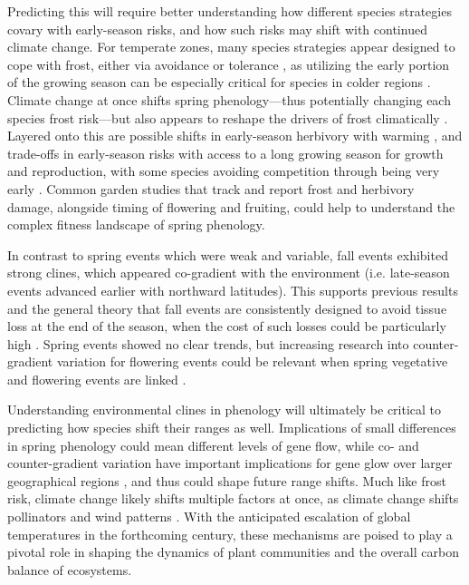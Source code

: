 \documentclass{article}
\begin{document}
Predicting this will require better understanding how different species strategies covary with early-season risks, and how such risks may shift with continued climate change. For temperate zones, many species strategies appear designed to cope with frost, either via avoidance or tolerance \citep{alberto11, lenz16, allevato19}, as utilizing the early portion of the growing season can be especially critical for species in colder regions \citep{morin07, dantec15}. Climate change at once shifts spring phenology---thus potentially changing each species frost risk---but also appears to reshape the drivers of frost climatically \citep{cat2021pep}. Layered onto this are possible shifts in early-season herbivory with warming \citep{meineke2019}, and trade-offs in early-season risks with access to a long growing season for growth and reproduction, with some species avoiding competition through being very early \citep{guo22}. Common garden studies that track and report frost and herbivory damage, alongside timing of flowering and fruiting, could help to understand the complex fitness landscape of spring phenology. 

In contrast to spring events which were weak and variable, fall events exhibited strong clines, which appeared co-gradient with the environment (i.e. late-season events advanced earlier with northward latitudes). This supports previous results and the general theory that fall events are consistently designed to avoid tissue loss at the end of the season, when the cost of such losses could be particularly high \citep{AitkenBemmels16, Alberto13}. Spring events showed no clear trends, but increasing research into counter-gradient variation for flowering events could be relevant when spring vegetative and flowering events are linked \citep{dan2021nph}. 

Understanding environmental clines in phenology will ultimately be critical to predicting how species shift their ranges as well. Implications of small differences in spring phenology could mean different levels of gene flow, while co- and counter-gradient variation have important implications for gene glow over larger geographical regions \citep{bach20}, and thus could shape future range shifts. Much like frost risk, climate change likely shifts multiple factors at once, as climate change shifts pollinators and wind patterns \citep{kling21}. With the anticipated escalation of global temperatures in the forthcoming century, these mechanisms are poised to play a pivotal role in shaping the dynamics of plant communities and the overall carbon balance of ecosystems.
\end{document}
